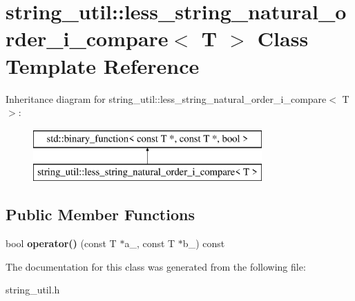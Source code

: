 \hypertarget{classstring__util_1_1less__string__natural__order__i__compare}{\section{string\+\_\+util\+:\+:less\+\_\+string\+\_\+natural\+\_\+order\+\_\+i\+\_\+compare$<$ T $>$ Class Template Reference}
\label{classstring__util_1_1less__string__natural__order__i__compare}
}
Inheritance diagram for string\+\_\+util\+:\+:less\+\_\+string\+\_\+natural\+\_\+order\+\_\+i\+\_\+compare$<$ T $>$\+:\begin{figure}[H]
\begin{center}
\leavevmode
\includegraphics[height=2.000000cm]{classstring__util_1_1less__string__natural__order__i__compare}
\end{center}
\end{figure}
\subsection*{Public Member Functions}
\begin{DoxyCompactItemize}
\item 
\hypertarget{classstring__util_1_1less__string__natural__order__i__compare_a213ba84bcb81fa025951194acbdb899c}{bool {\bfseries operator()} (const T $\ast$a\+\_\+, const T $\ast$b\+\_\+) const }\label{classstring__util_1_1less__string__natural__order__i__compare_a213ba84bcb81fa025951194acbdb899c}

\end{DoxyCompactItemize}


The documentation for this class was generated from the following file\+:\begin{DoxyCompactItemize}
\item 
string\+\_\+util.\+h\end{DoxyCompactItemize}
